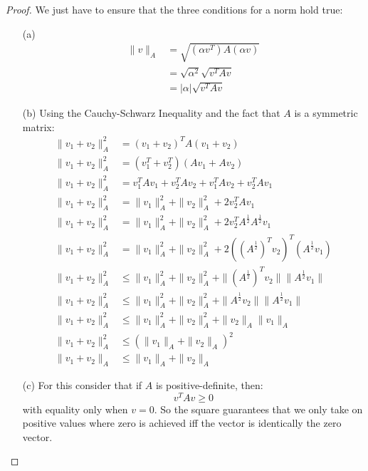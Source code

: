 \documentclass[12pt, letterpaper, onecolumn, conference, final]{IEEEtran}
\theoremstyle{definition}
\theoremstyle{plain}
\begin{document}
\begin{proof}
We just have to ensure that the three conditions for a norm hold true:
\begin{itemize}

\item[(a)]
\begin{equation*}
\begin{split}
\| v \|_A &= \sqrt{(\alpha v^T)A(\alpha v)} \\
&= \sqrt{\alpha^2}\sqrt{v^TAv} \\
&= |\alpha|\sqrt{v^TAv}
\end{split}
\end{equation*}

\item[(b)]
Using the Cauchy-Schwarz Inequality and the fact that $A$ is a symmetric matrix:
\begin{equation*}
\begin{split}
\| v_1 + v_2 \|_A^2 &= (v_1 + v_2)^TA(v_1 + v_2) \\
\| v_1 + v_2 \|_A^2 &= (v_1^T + v_2^T)(Av_1 + Av_2) \\
\| v_1 + v_2 \|_A^2 &= v_1^TAv_1 + v_2^TAv_2 + v_1^TAv_2 + v_2^TAv_1 \\
\| v_1 + v_2 \|_A^2 &= \| v_1 \|_A^2 +  \| v_2 \|_A^2 + 2v_2^TAv_1 \\
\| v_1 + v_2 \|_A^2 &= \| v_1 \|_A^2 +  \| v_2 \|_A^2 + 2v_2^TA^\frac{1}{2}A^\frac{1}{2}v_1 \\
\| v_1 + v_2 \|_A^2 &= \| v_1 \|_A^2 +  \| v_2 \|_A^2 + 2((A^\frac{1}{2})^Tv_2)^T(A^\frac{1}{2}v_1) \\
\| v_1 + v_2 \|_A^2 &\leq \| v_1 \|_A^2 +  \| v_2 \|_A^2 + \| (A^\frac{1}{2})^T v_2 \| \| A^\frac{1}{2} v_1 \| \\
\| v_1 + v_2 \|_A^2 &\leq \| v_1 \|_A^2 +  \| v_2 \|_A^2 + \| A^\frac{1}{2} v_2 \| \| A^\frac{1}{2} v_1 \| \\
\| v_1 + v_2 \|_A^2 &\leq \| v_1 \|_A^2 +  \| v_2 \|_A^2 + \| v_2 \|_A \| v_1 \|_A \\
\| v_1 + v_2 \|_A^2 &\leq (\| v_1 \|_A + \| v_2 \|_A)^2 \\
\| v_1 + v_2 \|_A &\leq \| v_1 \|_A + \| v_2 \|_A 
\end{split}
\end{equation*}

\item[(c)]
For this consider that if $A$ is positive-definite, then:
\begin{equation*}
v^TAv \geq 0
\end{equation*}
with equality only when $v = 0$. So the square guarantees that we only take on positive values where zero is achieved iff the vector is identically the zero vector.

\end{itemize}
\end{proof}
\end{document}
